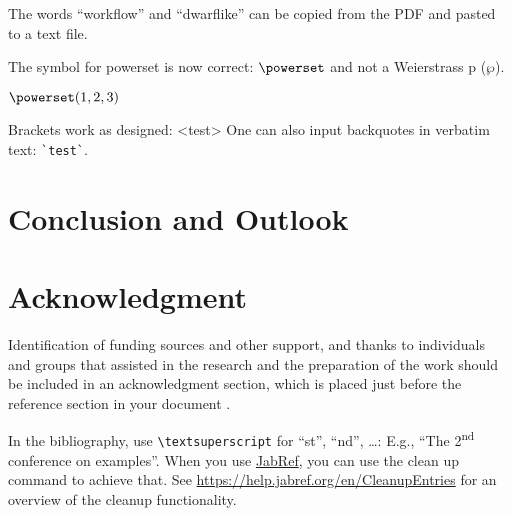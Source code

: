 \documentclass[conference,a4paper]{IEEEtran}[2015/08/26]
\begin{document}
\begin{ltgexample}
The words \enquote{workflow} and \enquote{dwarflike} can be copied from the PDF and pasted to a text file.
\end{ltgexample}

\begin{ltgexample}
The symbol for powerset is now correct: $\powerset$ and not a Weierstrass p ($\wp$).

$\powerset({1,2,3})$
\end{ltgexample}

\begin{ltgexample}
Brackets work as designed:
<test>
One can also input backquotes in verbatim text: \verb|`test`|.
\end{ltgexample}


\section{Conclusion and Outlook}
\label{sec:outlook}
\lipsum[1-2]

\section*{Acknowledgment}

Identification of funding sources and other support, and thanks to individuals and groups that assisted in the research and the preparation of the work should be included in an acknowledgment section, which is placed just before the reference section in your document \cite{acmart}.


In the bibliography, use \texttt{\textbackslash textsuperscript} for \enquote{st}, \enquote{nd}, \ldots:
E.g., \enquote{The 2\textsuperscript{nd} conference on examples}.
When you use \href{https://www.jabref.org}{JabRef}, you can use the clean up command to achieve that.
See \url{https://help.jabref.org/en/CleanupEntries} for an overview of the cleanup functionality.

\end{document}
